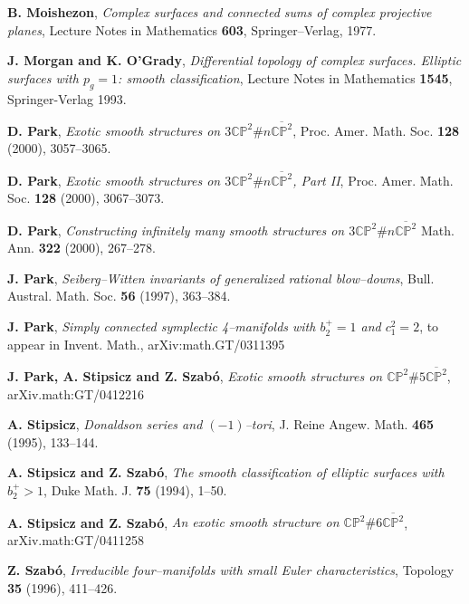 \documentclass[11pt]{gtart}
\theoremstyle{definition}
\numberwithin{equation}{section}
\newcommand{\cpkk}{{\overline {{\mathbb C}{\mathbb P}^2}}}
\newcommand{\cpk}{{\mathbb {CP}}^2}
\newcommand{\cphat}{{\mathbb {CP}}^2\# 6{\overline {{\mathbb C}{\mathbb P}^2}}}
\newcommand{\cpnyolc}{{\mathbb {CP}}^2\# 8{\overline {{\mathbb C}{\mathbb P}^2}}}
\begin{document}
\begin{thebibliography}[AAA]

 {\bf B. Moishezon},
{\it Complex surfaces and connected sums of complex
projective planes}, Lecture Notes in Mathematics {\bf603}, Springer--Verlag,
1977.

{\bf J. Morgan and K. O'Grady}, {\it Differential topology
of complex surfaces. Elliptic surfaces with $p_g=1$: smooth
classification}, Lecture Notes in Mathematics {\bf1545},
Springer-Verlag 1993.

 {\bf D. Park},
{\it Exotic smooth structures on $3\cpk \# n \cpkk$}, Proc. Amer. Math. Soc.
{\bf128} (2000), 3057--3065.


 {\bf D. Park},
{\it Exotic smooth structures on $3\cpk \# n \cpkk$, Part II}, 
Proc. Amer. Math. Soc. {\bf128} (2000), 3067--3073.

 {\bf D. Park},
{\it Constructing infinitely many smooth structures on $3\cpk \# n \cpkk$} 
Math. Ann. {\bf322} (2000), 267--278.


 {\bf J. Park},
{\it Seiberg--Witten invariants of generalized rational blow--downs},
Bull. Austral. Math. Soc. {\bf56} (1997), 363--384.

 {\bf J. Park}, 
{\it Simply connected symplectic 4--manifolds with $b_2^+=1$ and $c^2_1=2$},
to appear in Invent. Math., arXiv:math.GT/0311395

 {\bf J. Park, A. Stipsicz and Z. Szab\'o},
{\it Exotic smooth structures on $\cpk \# 5 \cpkk$}, arXiv.math:GT/0412216

{\bf A. Stipsicz},
{\it Donaldson series and $(-1)$--tori}, J. Reine Angew. Math. {\bf465}
(1995), 133--144.

 {\bf A. Stipsicz and Z. Szab\'o},
{\it The smooth classification of elliptic surfaces with $b_2^+>1$},
Duke Math. J. {\bf75} (1994), 1--50.


 {\bf A. Stipsicz and Z. Szab\'o},
{\it An exotic smooth structure on $\cphat$}, arXiv.math:GT/0411258


 {\bf Z. Szab\'o},
{\it Irreducible four--manifolds with small Euler characteristics},
Topology {\bf35} (1996), 411--426.

\end{thebibliography}
\end{document}
